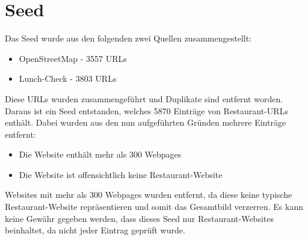 \section{Seed}
Das Seed wurde aus den folgenden zwei Quellen zusammengestellt:
\begin{itemize}
	\item OpenStreetMap - 3557 URLs
	\item Lunch-Check - 3803 URLs
\end{itemize}
Diese URLs wurden zusammengeführt und Duplikate sind entfernt worden.
Daraus ist ein Seed entstanden, welches 5870 Einträge von Restaurant-URLs enthält.
Dabei wurden aus den nun aufgeführten Gründen mehrere Einträge entfernt:
\begin{itemize}
	\item Die Website enthält mehr als 300 Webpages
	\item Die Website ist offensichtlich keine Restaurant-Website
\end{itemize}
Websites mit mehr als 300 Webpages wurden entfernt, da diese keine typische Restaurant-Website repräsentieren und somit das Gesamtbild verzerren.
Es kann keine Gewähr gegeben werden, dass dieses Seed nur Restaurant-Websites beinhaltet, da nicht jeder Eintrag geprüft wurde.
